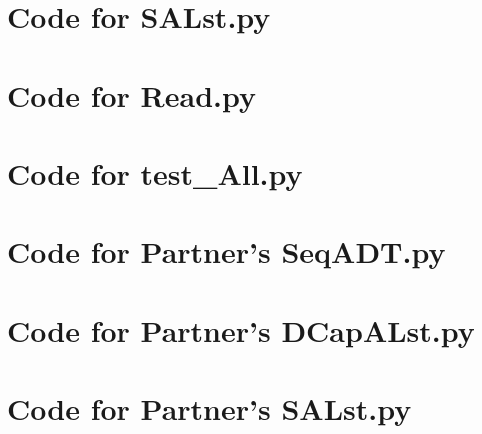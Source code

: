 \documentclass[12pt]{article}
\begin{document}
\section{Code for SALst.py}

\noindent 

\newpage

\section{Code for Read.py}

\noindent 

\newpage

\section{Code for test\_All.py}

\noindent 

\newpage

\section{Code for Partner's SeqADT.py}

\noindent 

\newpage

\section{Code for Partner's DCapALst.py}

\noindent 

\newpage

\section{Code for Partner's SALst.py}

\noindent 
\end{document}
